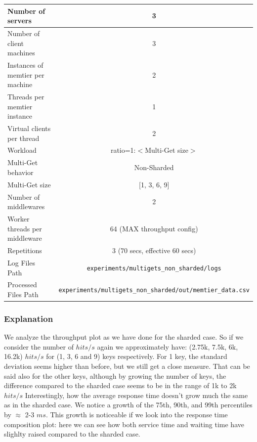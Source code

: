 \documentclass[11pt,a4paper]{article}
\begin{document}
\begin{center}
	\scriptsize{
		\begin{tabular}{|l|c|}
			\hline Number of servers                & 3                       \\ 
			\hline Number of client machines        & 3                       \\ 
			\hline Instances of memtier per machine & 2                       \\ 
			\hline Threads per memtier instance     & 1                       \\
			\hline Virtual clients per thread       & 2                		 \\ 
			\hline Workload                         & ratio=1:$<$Multi-Get size$>$              \\
			\hline Multi-Get behavior               & Non-Sharded             \\
			\hline Multi-Get size                   & [1, 3, 6, 9]                  \\
			\hline Number of middlewares            & 2                       \\
            \hline Worker threads per middleware    & 64 (MAX throughput config) \\
            \hline Repetitions                      & 3 (70 secs, effective 60 secs) \\ 
            \hline Log Files Path                   & \texttt{experiments/multigets\_non\_sharded/logs} \\
            \hline Processed Files Path             & \texttt{experiments/multigets\_non\_sharded/out/memtier\_data.csv}\\
            \hline
		\end{tabular}
	} 
\end{center}

\subsubsection{Explanation}

We analyze the throughput plot as we have done for the sharded case. So if we consider the number of $hits/s$ again we approximately have: (2.75k, 7.5k, 6k, 16.2k) $hits/s$ for (1, 3, 6 and 9) keys respectively.
For 1 key, the standard deviation seems higher than before, but we still get a close measure. 
That can be said also for the other keys, although by growing the number of keys, the difference compared to the sharded case seems to be in the range of 1k to 2k $hits/s$
Interestingly, how the average response time doesn't grow much the same as in the sharded case. We notice a growth of the 75th, 90th, and 99th percentiles by $\approx$ 2-3 $ms$.
This growth is noticeable if we look into the response time composition plot: here we can see how both service time and waiting time have slighlty raised compared to the sharded case.
\end{document}
